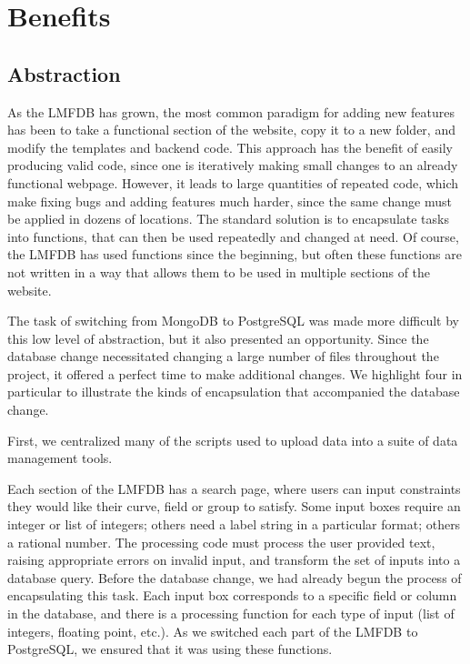 \documentclass{amsart}
\begin{document}
\section{Benefits}

\subsection{Abstraction}

As the LMFDB has grown, the most common paradigm for adding new features has been to take a functional section of the website, copy it to a new folder, and modify the templates and backend code.
This approach has the benefit of easily producing valid code, since one is iteratively making small changes to an already functional webpage.
However, it leads to large quantities of repeated code, which make fixing bugs and adding features much harder, since the same change must be applied in dozens of locations.
The standard solution is to encapsulate tasks into functions, that can then be used repeatedly and changed at need.
Of course, the LMFDB has used functions since the beginning, but often these functions are not written in a way that allows them to be used in multiple sections of the website.

The task of switching from MongoDB to PostgreSQL was made more difficult by this low level of abstraction, but it also presented an opportunity.
Since the database change necessitated changing a large number of files throughout the project, it offered a perfect time to make additional changes.
We highlight four in particular to illustrate the kinds of encapsulation that accompanied the database change.

First, we centralized many of the scripts used to upload data into a suite of data management tools. 

Each section of the LMFDB has a search page, where users can input constraints they would like their curve, field or group to satisfy.
Some input boxes require an integer or list of integers; others need a label string in a particular format; others a rational number.
The processing code must process the user provided text, raising appropriate errors on invalid input, and transform the set of inputs into a database query.
Before the database change, we had already begun the process of encapsulating this task.
Each input box corresponds to a specific field or column in the database, and there is a processing function for each type of input (list of integers, floating point, etc.).
As we switched each part of the LMFDB to PostgreSQL, we ensured that it was using these functions.
\end{document}
